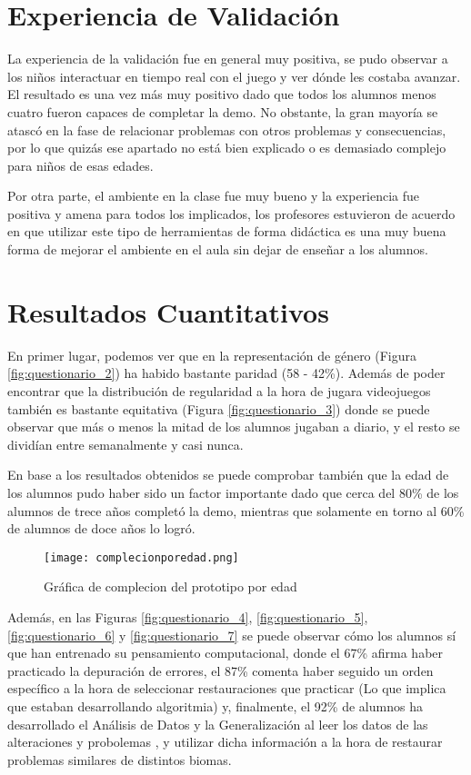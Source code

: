 \section{Experiencia de Validación}

La experiencia de la validación fue en general muy positiva, se pudo observar a los niños interactuar en tiempo real con el juego y ver dónde
 les costaba avanzar. El resultado es una vez más muy positivo dado que todos los alumnos menos cuatro fueron capaces de completar la demo.
  No obstante, la gran mayoría se atascó en la fase de relacionar problemas con otros problemas y consecuencias, por lo que quizás ese apartado
   no está bien explicado o es demasiado complejo para niños de esas edades.

Por otra parte, el ambiente en la clase fue muy bueno y la experiencia fue positiva y amena para todos los implicados, los profesores estuvieron 
de acuerdo en que utilizar este tipo de herramientas de forma didáctica es una muy buena forma de mejorar el ambiente en el aula sin dejar de enseñar
 a los alumnos. 

\section{Resultados Cuantitativos}

En primer lugar, podemos ver que en la representación de género (Figura \ref{fig:questionario_2}) ha habido bastante
 paridad (58 - 42\%). Además de poder encontrar que la distribución de regularidad a la hora de jugara videojuegos también 
 es bastante equitativa (Figura \ref{fig:questionario_3}) donde se puede observar que más o menos la mitad de los alumnos 
 jugaban a diario, y el resto se dividían entre semanalmente y casi nunca.

En base a los resultados obtenidos se puede comprobar también que la edad de los alumnos pudo haber sido un factor importante dado que cerca del 80\% de los alumnos de trece años completó la demo, mientras que solamente en torno al 60\% de alumnos de doce años lo logró.   

 \begin{figure}[H]
    \centering
      \texttt{[image: complecionporedad.png]}
    \caption{Gráfica de complecion del prototipo por edad}
    \label{fig:paridad}
  \end{figure}

Además, en las Figuras \ref{fig:questionario_4}, \ref{fig:questionario_5}, \ref{fig:questionario_6} y \ref{fig:questionario_7} se puede observar cómo
 los alumnos sí que han entrenado su pensamiento computacional, donde el 67\% afirma haber practicado la depuración de errores, el 87\% comenta haber
  seguido un orden específico a la hora de seleccionar restauraciones que practicar (Lo que implica que estaban desarrollando algoritmia) y,
   finalmente, el 92\% de alumnos ha desarrollado el Análisis de Datos y la Generalización al leer los datos de las alteraciones y probolemas
   , y utilizar dicha información a la hora de restaurar problemas similares de distintos biomas.

